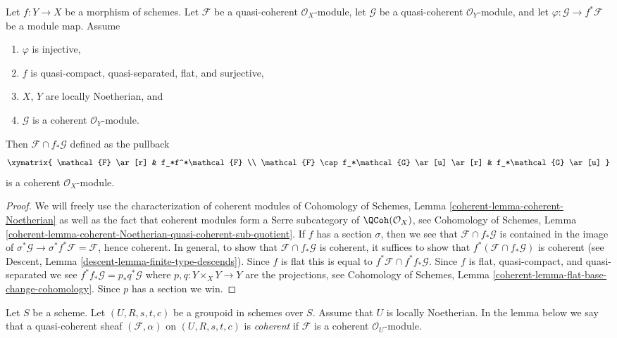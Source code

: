 \begin{lemma}
\label{lemma-push-pull}
Let $f : Y \to X$ be a morphism of schemes. Let $\mathcal{F}$
be a quasi-coherent $\mathcal{O}_X$-module, let $\mathcal{G}$
be a quasi-coherent $\mathcal{O}_Y$-module, and let
$\varphi : \mathcal{G} \to f^*\mathcal{F}$ be a module map. Assume
\begin{enumerate}
\item $\varphi$ is injective,
\item $f$ is quasi-compact, quasi-separated, flat, and surjective,
\item $X$, $Y$ are locally Noetherian, and
\item $\mathcal{G}$ is a coherent $\mathcal{O}_Y$-module.
\end{enumerate}
Then $\mathcal{F} \cap f_*\mathcal{G}$ defined as the pullback
$$
\xymatrix{
\mathcal{F} \ar[r] & f_*f^*\mathcal{F} \\
\mathcal{F} \cap f_*\mathcal{G} \ar[u] \ar[r] &
f_*\mathcal{G} \ar[u]
}
$$
is a coherent $\mathcal{O}_X$-module.
\end{lemma}

\begin{proof}
We will freely use the characterization of coherent modules of
Cohomology of Schemes, Lemma \ref{coherent-lemma-coherent-Noetherian}
as well as the fact that coherent modules form a Serre subcategory
of $\QCoh(\mathcal{O}_X)$, see
Cohomology of Schemes,
Lemma \ref{coherent-lemma-coherent-Noetherian-quasi-coherent-sub-quotient}.
If $f$ has a section $\sigma$, then we see that
$\mathcal{F} \cap f_*\mathcal{G}$ is contained in the image of
$\sigma^*\mathcal{G} \to \sigma^*f^*\mathcal{F} = \mathcal{F}$,
hence coherent. In general, to show that $\mathcal{F} \cap f_*\mathcal{G}$
is coherent, it suffices to show that
$f^*(\mathcal{F} \cap f_*\mathcal{G})$ is coherent (see
Descent, Lemma \ref{descent-lemma-finite-type-descends}).
Since $f$ is flat this is equal to $f^*\mathcal{F} \cap f^*f_*\mathcal{G}$.
Since $f$ is flat, quasi-compact, and quasi-separated we see
$f^*f_*\mathcal{G} = p_*q^*\mathcal{G}$ where $p, q : Y \times_X Y \to Y$
are the projections, see
Cohomology of Schemes, Lemma \ref{coherent-lemma-flat-base-change-cohomology}.
Since $p$ has a section we win.
\end{proof}

\noindent
Let $S$ be a scheme. Let $(U, R, s, t, c)$ be a groupoid in schemes over $S$.
Assume that $U$ is locally Noetherian. In the lemma below we say that a
quasi-coherent sheaf $(\mathcal{F}, \alpha)$ on $(U, R, s, t, c)$ is
{\it coherent} if $\mathcal{F}$ is a coherent $\mathcal{O}_U$-module.


